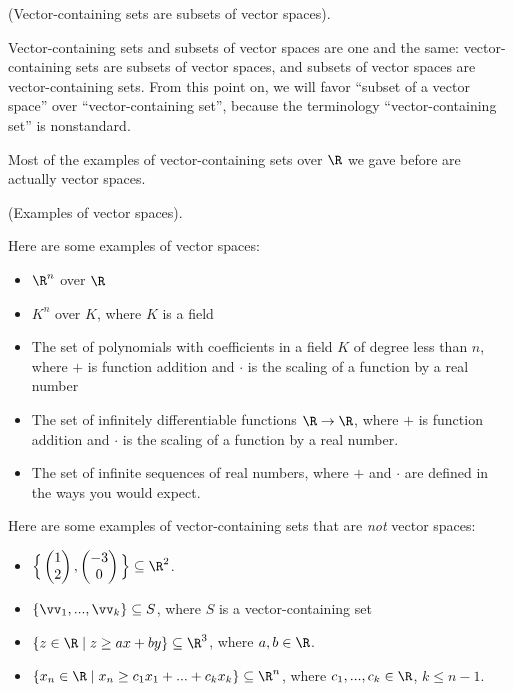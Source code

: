 \begin{remark}
    (Vector-containing sets are subsets of vector spaces).

    Vector-containing sets and subsets of vector spaces are one and the same: vector-containing sets are subsets of vector spaces, and subsets of vector spaces are vector-containing sets. From this point on, we will favor ``subset of a vector space'' over ``vector-containing set'', because the terminology ``vector-containing set'' is nonstandard.
\end{remark}

Most of the examples of vector-containing sets over $\R$ we gave before are actually vector spaces.

\begin{remark}
    (Examples of vector spaces).
    
    Here are some examples of vector spaces:
    
    \begin{itemize}
        \item $\R^n$ over $\R$
        \item $K^n$ over $K$, where $K$ is a field
        \item The set of polynomials with coefficients in a field $K$ of degree less than $n$, where $+$ is function addition and $\cdot$ is the scaling of a function by a real number
        \item The set of infinitely differentiable functions $\R \rightarrow \R$, where $+$ is function addition and $\cdot$ is the scaling of a function by a real number.
        \item The set of infinite sequences of real numbers, where $+$ and $\cdot$ are defined in the ways you would expect.
    \end{itemize}
    
    Here are some examples of vector-containing sets that are \textit{not} vector spaces:
    
    \begin{itemize}
        \item $\Big\{\begin{pmatrix} 1 \\ 2 \end{pmatrix}, \begin{pmatrix} -3 \\ 0 \end{pmatrix}\Big\} \subseteq \R^2$.
        \item $\{\vv_1, ..., \vv_k\} \subseteq S$, where $S$ is a vector-containing set
        \item $\{ z \in \R \mid z \geq ax + by \} \subseteq \R^3$, where $a, b \in \R$.
        \item $\{ x_n \in \R \mid x_n \geq c_1 x_1 + ... + c_k x_k \} \subseteq \R^n$, where $c_1, ..., c_k \in \R$, $k \leq n - 1$.
    \end{itemize}
\end{remark}

